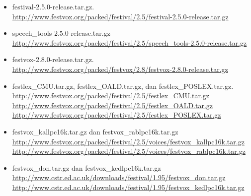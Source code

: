 \documentclass[12pt,]{article}
\begin{document}
	\begin{itemize}
		\item festival-2.5.0-release.tar.gz.\\
		\url{http://www.festvox.org/packed/festival/2.5/festival-2.5.0-release.tar.gz}

		\item speech\_tools-2.5.0-release.tar.gz \\
		\url{http://www.festvox.org/packed/festival/2.5/speech_tools-2.5.0-release.tar.gz}

		\item festvox-2.8.0-release.tar.gz.\\
		\url{http://www.festvox.org/packed/festvox/2.8/festvox-2.8.0-release.tar.gz}

		\item festlex\_CMU.tar.gz, festlex\_OALD.tar.gz, dan festlex\_POSLEX.tar.gz. \\
		\url{http://www.festvox.org/packed/festival/2.5/festlex_CMU.tar.gz}\\
		\url{http://www.festvox.org/packed/festival/2.5/festlex_OALD.tar.gz}\\
		\url{http://www.festvox.org/packed/festival/2.5/festlex_POSLEX.tar.gz}

		\item festvox\_kallpc16k.tar.gz dan festvox\_rablpc16k.tar.gz \\
		\url{http://www.festvox.org/packed/festival/2.5/voices/festvox_kallpc16k.tar.gz}\\
		\url{http://www.festvox.org/packed/festival/2.5/voices/festvox_rablpc16k.tar.gz}

		\item festvox\_don.tar.gz dan  festvox\_kedlpc16k.tar.gz\\
		\url{http://www.cstr.ed.ac.uk/downloads/festival/1.95/festvox_don.tar.gz} \\
		\url{http://www.cstr.ed.ac.uk/downloads/festival/1.95/festvox_kedlpc16k.tar.gz}


\end{itemize}
\end{document}
